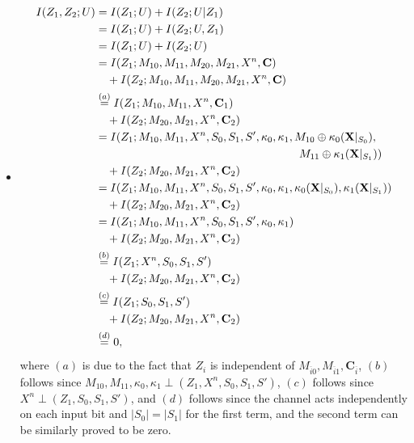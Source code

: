\documentclass[runningheads]{llncs}
\begin{document}
\begin{itemize}
    \item \begin{align*}
        I(Z_1, Z_2 ; U) &= I(Z_1;U) + I(Z_2;U|Z_1)\\
        & = I(Z_1;U) + I(Z_2;U,Z_1)\\
        & = I(Z_1;U) + I(Z_2;U)\\
        & = I(Z_1 ; M_{10}, M_{11}, M_{20}, M_{21}, X^n, \mathbf{C}) \\
        & \quad + I(Z_2 ; M_{10}, M_{11}, M_{20}, M_{21}, X^n, \mathbf{C})\\
        & \overset{(a)}{=} I(Z_1 ; M_{10}, M_{11}, X^n, \mathbf{C}_1) \\
        & \quad + I(Z_2 ; M_{20}, M_{21}, X^n, \mathbf{C}_2)\\
        & = I(Z_1 ; M_{10}, M_{11}, X^n, S_0, S_1, S', \kappa_0, \kappa_1, M_{10}\oplus\kappa_0(\mathbf{X}|_{S_0}),\notag\\
        & \qquad\qquad\qquad\qquad\qquad\qquad\qquad\qquad\qquad M_{11}\oplus\kappa_1(\mathbf{X}|_{S_1})) \\
        & \quad + I(Z_2 ; M_{20}, M_{21}, X^n, \mathbf{C}_2)\\
        &= I(Z_1 ; M_{10}, M_{11}, X^n, S_0, S_1, S', \kappa_0, \kappa_1, \kappa_0(\mathbf{X}|_{S_0}),\kappa_1(\mathbf{X}|_{S_1}))\\
        & \quad + I(Z_2 ; M_{20}, M_{21}, X^n, \mathbf{C}_2)\\
        & = I(Z_1 ; M_{10}, M_{11}, X^n, S_0, S_1, S', \kappa_0, \kappa_1) \\
        & \quad + I(Z_2 ; M_{20}, M_{21}, X^n, \mathbf{C}_2)\\
        & \overset{(b)}{=} I(Z_1 ; X^n, S_0, S_1, S') \\
        & \quad + I(Z_2 ; M_{20}, M_{21}, X^n, \mathbf{C}_2)\\
        &\overset{(c)}{=} I(Z_1 ; S_0, S_1, S') \\
        & \quad + I(Z_2 ; M_{20}, M_{21}, X^n, \mathbf{C}_2)\\
        &\overset{(d)}{=} 0,
    \end{align*}
    where $(a)$ is due to the fact that $Z_i$ is independent of $M_{\overline{i}0}, M_{\overline{i}1}, \mathbf{C}_{\overline{i}}$, $(b)$ follows since $M_{10}, M_{11}, \kappa_0, \kappa_1 \perp (Z_1, X^n, S_0, S_1, S')$, $(c)$ follows since $X^n \perp (Z_1, S_0, S_1, S')$, and $(d)$ follows since the channel acts independently on each input bit and $|S_0| = |S_1|$ for the first term, and the second term can be similarly proved to be zero.

\end{itemize}
\end{document}

